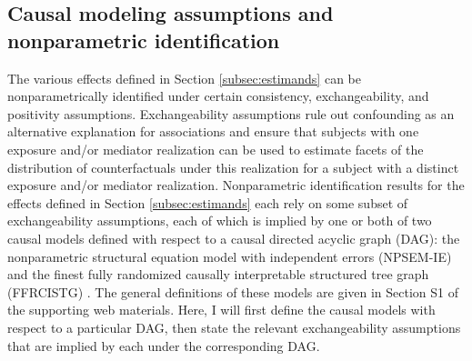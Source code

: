 \documentclass[12pt]{article}
\begin{document}
\subsection{Causal modeling assumptions and nonparametric identification}
\label{subsec:assns}

\begin{comment}
Corresponding population-level indirect effects may be defined by taking contrasts of expectations of the nested counterfactuals in the definitions of individual-level indirect effects. For instance, $E[Y\{a,M(a)\}-Y\{a,M(a^*)\}]$ is the population-level total indirect effect and $E[Y\{a^*,M(a)\}-Y\{a^*,M(a^*)\}]$ is the population-level pure indirect effect. One may also define a population-level indirect effect as $E[Y\{A,M(a)\}-Y\{A,M(a^*)\}]$. [CHECK WHETHER THIS EXISTS IN THE LITERATURE (IT MUST RIGHT?).] Population-level indirect effects may also be defined on scales other than the difference scale, such as the relative risk or odds ratio scale when the outcome is binary.
\end{comment}

The various effects defined in Section \ref{subsec:estimands} can be nonparametrically identified under certain consistency, exchangeability, and positivity assumptions. Exchangeability assumptions rule out confounding as an alternative explanation for associations and ensure that subjects with one exposure and/or mediator realization can be used to estimate facets of the distribution of counterfactuals under this realization for a subject with a distinct exposure and/or mediator realization. Nonparametric identification results for the effects defined in Section \ref{subsec:estimands} each rely on some subset of exchangeability assumptions, each of which is implied by one or both of two causal models defined with respect to a causal directed acyclic graph (DAG): the nonparametric structural equation model with independent errors (NPSEM-IE) \citep{pearl1995causal} and the finest fully randomized causally interpretable structured tree graph (FFRCISTG) \citep{robins1986new}. The general definitions of these models are given in Section S1 of the supporting web materials. Here, I will first define the causal models with respect to a particular DAG, then state the relevant exchangeability assumptions that are implied by each under the corresponding DAG.
\end{document}

